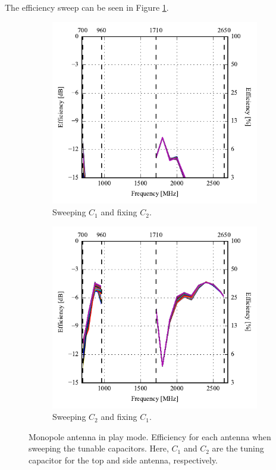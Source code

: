The efficiency sweep can be seen in Figure \ref{fig:eff_mono_modi_play_mode}. 
\begin{figure}[htbp]
    \centering
    \begin{subfigure}{0.49\linewidth}
        \includegraphics{img/tech_sol/monopole/highband/ue/playmode/eff_top.pdf}
        \caption{Sweeping $C_1$ and fixing $C_2$.}
    \end{subfigure}
    \hfill
    \begin{subfigure}{0.49\linewidth}
        \includegraphics{img/tech_sol/monopole/highband/ue/playmode/eff_side.pdf}
        \caption{Sweeping $C_2$ and fixing $C_1$.}
    \end{subfigure}
    \caption{Monopole antenna in play mode. Efficiency for each antenna when sweeping the tunable capacitors. Here, $C_1$ and $C_2$ are the tuning capacitor for the top and side antenna, respectively. }
    \label{fig:eff_mono_modi_play_mode}
\end{figure}


